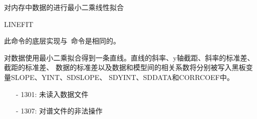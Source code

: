 \label{cmd:linefit}

对内存中数据的进行最小二乘线性拟合

\begin{SACSTX}
LINEFIT
\end{SACSTX}

此命令的底层实现与~命令是相同的。

对数据使用最小二乘拟合得到一条直线。直线的斜率、y轴截距、斜率的标准差、截距的标准差、
数据的标准差以及数据和模型间的相关系数将分别被写入黑板变量SLOPE、YINT、SDSLOPE、
SDYINT、SDDATA和CORRCOEF中。

\begin{itemize}
\item[-]1301: 未读入数据文件
\item[-]1307: 对谱文件的非法操作
\end{itemize}
